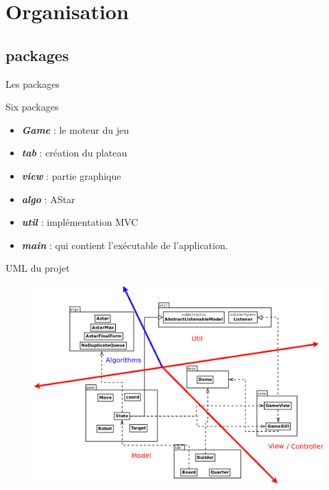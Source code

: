 \documentclass{beamer}
\begin{document}
\section{Organisation}
\subsection{packages}
\begin{frame}{Les packages}
    \begin{block}{Six packages}
        \begin{itemize}
            \item \textbf{\textit{Game}} : le moteur du jeu
            \item \textbf{\textit{tab}} : création du plateau
            \item \textbf{\textit{view}} : partie graphique
            \item \textbf{\textit{algo}} : AStar
            \item \textbf{\textit{util}} : implémentation MVC
            \item \textbf{\textit{main}} : qui contient l'exécutable de l'application.
        \end{itemize}
    \end{block}
    
\end{frame}
\begin{frame}{UML du projet}
    \begin{figure}
        \centering
        \includegraphics[scale=0.26]{Images/package.png}
    \end{figure}
\end{frame}
\end{document}
